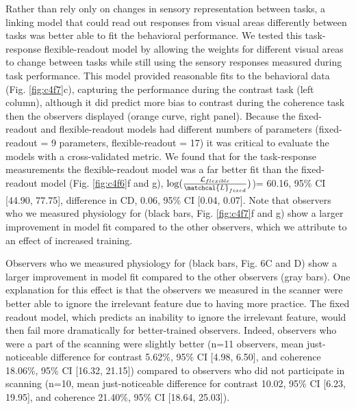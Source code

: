 \documentclass{report}
\begin{document}
Rather than rely only on changes in sensory representation between tasks, a linking model that could read out responses from visual areas differently between tasks was better able to fit the behavioral performance. We tested this task-response flexible-readout model by allowing the weights for different visual areas to change between tasks while still using the sensory responses measured during task performance. This model provided reasonable fits to the behavioral data (Fig. \ref{fig:c4f7}c), capturing the performance during the contrast task (left column), although it did predict more bias to contrast during the coherence task then the observers displayed (orange curve, right panel). Because the fixed-readout and flexible-readout models had different numbers of parameters (fixed-readout = 9 parameters, flexible-readout = 17) it was critical to evaluate the models with a cross-validated metric. We found that for the task-response measurements the flexible-readout model was a far better fit than the fixed-readout model (Fig. \ref{fig:c4f6}f and g), $\log(\frac{\mathcal{L}_{flexible}}{\matchcal{L}_{fixed}})$)= 60.16, 95\% CI [44.90, 77.75], difference in CD, 0.06, 95\% CI [0.04, 0.07]. Note that observers who we measured physiology for (black bars, Fig. \ref{fig:c4f7}f and g) show a larger improvement in model fit compared to the other observers, which we attribute to an effect of increased training.

Observers who we measured physiology for (black bars, Fig. 6C and D) show a larger improvement in model fit compared to the other observers (gray bars). One explanation for this effect is that the observers we measured in the scanner were better able to ignore the irrelevant feature due to having more practice. The fixed readout model, which predicts an inability to ignore the irrelevant feature, would then fail more dramatically for better-trained observers. Indeed, observers who were a part of the scanning were slightly better (n=11 observers, mean just-noticeable difference for contrast 5.62\%, 95\% CI [4.98, 6.50], and coherence 18.06\%, 95\% CI [16.32, 21.15]) compared to observers who did not participate in scanning (n=10, mean just-noticeable difference for contrast 10.02, 95\% CI [6.23, 19.95], and coherence 21.40\%, 95\% CI [18.64, 25.03]). 
\end{document}
